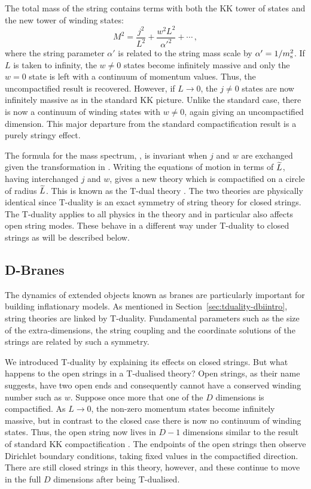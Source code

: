 The total mass of the string contains terms with both the KK tower of states
and the new tower of winding states:
\begin{equation}
\label{eq:closedmass-dbiintro}
 M^2 = \frac{j^2}{L^2} + \frac{w^2 L^2}{\alpha'^2} + \cdots\,,
\end{equation}
where the string parameter $\alpha'$ is related to the string mass scale by
$\alpha'=1/m_\mathrm{s}^2$.
If $L$ is taken to infinity, the $w\ne 0$ states become infinitely massive and
only the $w=0$ state is left with a continuum of momentum values. Thus, the
uncompactified result is recovered. However, if $L\rightarrow0$, the $j\ne 0$
states are now infinitely massive as in the standard KK picture. Unlike the
standard case, there is now a continuum of winding states with $w\ne 0$,
again giving an
uncompactified dimension. This major departure from the standard
compactification result is a purely stringy effect. 

The formula for the mass spectrum, , is invariant
when $j$ and $w$ are exchanged given the transformation in .
Writing the equations of motion in terms of $\widetilde{L}$, having interchanged $j$ and
$w$, gives a new theory which is compactified on a circle of radius $\widetilde{L}$. This is known as the
T-dual theory \cite{Sakai1986,Kikkawa1984b}. The two
theories are physically identical since T-duality is an exact symmetry
of string theory for closed strings. The T-duality applies to all physics in the theory and in
particular also affects open string modes. These behave in a different way under T-duality to closed
strings as will be described below.

% 
\subsection{D-Branes}
\label{sec:dbranes-dbiintro}
The dynamics of extended objects known as branes are particularly important for
building inflationary models.
As mentioned in Section~\ref{sec:tduality-dbiintro}, string
theories are linked by T-duality. Fundamental parameters such as the size of the
extra-dimensions, the string coupling and the
coordinate solutions of the strings are related by such a symmetry.


We introduced T-duality by explaining
its effects on closed strings. But what happens to the open strings in a T-dualised theory? Open
strings, as their name suggests, have two open ends and
consequently cannot have a conserved winding number such as $w$. Suppose once more
that one
of the $D$ dimensions is compactified. As $L\rightarrow0$, the non-zero momentum
states become infinitely massive, but in contrast to the closed case there is now
no continuum of winding states. Thus, the open string now lives in $D-1$ dimensions
similar to the result of standard KK compactification \cite{Johnson2000}.
The endpoints of the open strings 
then observe Dirichlet boundary conditions, taking fixed values in the compactified
direction.
There are still closed strings in this theory, however, and these continue to
move in the full $D$ dimensions after being T-dualised.  

